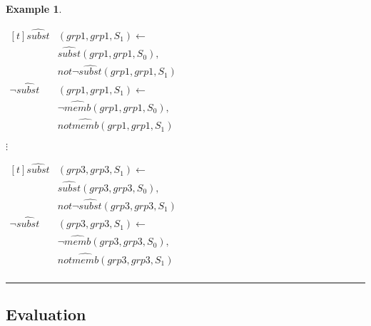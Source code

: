 \documentclass[10pt, twocolumn]{article}
\newtheorem{examp}{Example}
\newenvironment{example}{\begin{examp}\rm}{\rule{2mm}{2mm}\end{examp}}
\begin{document}
\begin{example}
\begin{enumerate}
              \begin{math}
                \begin{aligned}[t]
                  \hat{subst}&(grp1, grp1, S_{1}) \leftarrow \\
                  & \hat{subst}(grp1, grp1, S_{0}), \\
                  & not \lnot \hat{subst}(grp1, grp1, S_{1}) \\
                  \lnot \hat{subst}&(grp1, grp1, S_{1}) \leftarrow \\
                  & \lnot \hat{memb}(grp1, grp1, S_{0}), \\
                  & not \hat{memb}(grp1, grp1, S_{1})
                \end{aligned}
              \end{math}

              \hspace{1cm} $\vdots$

              \begin{math}
                \begin{aligned}[t]
                  \hat{subst}&(grp3, grp3, S_{1}) \leftarrow \\
                  & \hat{subst}(grp3, grp3, S_{0}), \\
                  & not \lnot \hat{subst}(grp3, grp3, S_{1}) \\
                  \lnot \hat{subst}&(grp3, grp3, S_{1}) \leftarrow \\
                  & \lnot \hat{memb}(grp3, grp3, S_{0}), \\
                  & not \hat{memb}(grp3, grp3, S_{1}) \\
                \end{aligned}
              \end{math}
          \end{enumerate}
        \end{example}
      \subsection{Evaluation}
\end{document}
